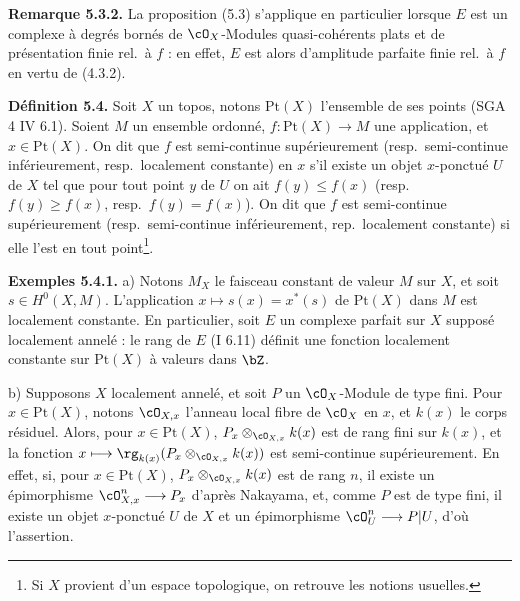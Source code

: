 \medskip

\noindent\textbf{Remarque 5.3.2.} La proposition (5.3) s'applique en particulier lorsque $E$ est un complexe \`{a} degr\'{e}s born\'{e}s de $\cO_X$-Modules quasi-coh\'{e}rents plats et de pr\'{e}sentation finie rel.\ \`{a} $f$ : en effet, $E$ est alors d'amplitude parfaite finie rel.\ \`{a} $f$ en vertu de (4.3.2).

\medskip

\noindent\textbf{D\'{e}finition 5.4.} Soit $X$ un topos, notons $\mathrm{Pt}(X)$ l'ensemble de ses points (SGA 4 IV 6.1). Soient $M$ un ensemble ordonn\'{e}, $f : \mathrm{Pt}(X) \longrightarrow M$ une application, et $x \in \mathrm{Pt}(X)$. On dit que $f$ est semi-continue sup\'{e}rieurement (resp.\ semi-continue inf\'{e}rieurement, resp.\ localement constante) en $x$ s'il existe un objet $x$-ponctu\'{e} $U$ de $X$ tel que pour tout point $y$ de $U$ on ait $f(y) \leq f(x)$ (resp.\ $f(y) \geq f(x)$, resp.\ $f(y) = f(x)$). On dit que $f$ est semi-continue sup\'{e}rieurement (resp.\ semi-continue inf\'{e}rieurement, rep.\ localement constante) si elle l'est en tout point\footnote{Si $X$ provient d'un espace topologique, on retrouve les notions usuelles.}.

\medskip

\noindent\textbf{Exemples 5.4.1.} a) Notons $M_X$ le faisceau constant de valeur $M$ sur $X$, et soit $s \in H^0(X, M)$. L'application $x \longmapsto s(x) = x^*(s)$ de $\mathrm{Pt}(X)$ dans $M$ est localement constante. En particulier, soit $E$ un complexe parfait sur $X$ suppos\'{e} localement annel\'{e} : le rang de $E$ (I 6.11) d\'{e}finit une fonction localement constante sur $\mathrm{Pt}(X)$ \`{a} valeurs dans $\bZ$.

\smallskip

b) Supposons $X$ localement annel\'{e}, et soit $P$ un $\cO_X$-Module de type fini. Pour $x \in \mathrm{Pt}(X)$, notons $\cO_{X,x}$ l'anneau local fibre de $\cO_X$ en $x$, et $k(x)$ le corps r\'{e}siduel. Alors, pour $x \in \mathrm{Pt}(X)$, $P_x \otimes_{\cO_{X,x}} k(x)$ est de rang fini sur $k(x)$, et la fonction $x \longmapsto \rg_{k(x)}(P_x \otimes_{\cO_{X,x}} k(x))$ est semi-continue sup\'{e}rieurement. En effet, si, pour $x \in \mathrm{Pt}(X)$, $P_x \otimes_{\cO_{X,x}} k(x)$ est de rang $n$, il existe un \'{e}pimorphisme $\cO_{X,x}^n \longrightarrow P_x$ d'apr\`{e}s Nakayama, et, comme $P$ est de type fini, il existe un objet $x$-ponctu\'{e} $U$ de $X$ et un \'{e}pimorphisme $\cO_U^n \longrightarrow P|U$, d'o\`{u} l'assertion.

